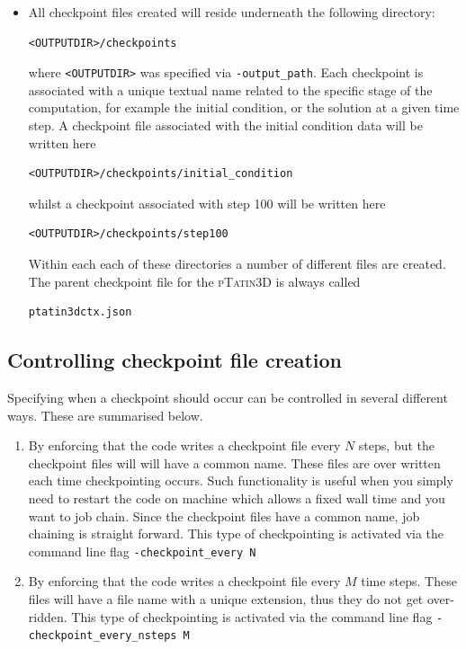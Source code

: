\documentclass[paper=a4, fontsize=11pt,twoside]{scrartcl}
\newcommand{\ptat}{{{\textsc{pTatin3D}}}}
\begin{document}
{{\begin{itemize}
\item All checkpoint files created will reside underneath the following directory:
\begin{lstlisting}
<OUTPUTDIR>/checkpoints
\end{lstlisting}
where {\tt <OUTPUTDIR>} was specified via {\tt -output\_path}.
Each checkpoint is associated with a unique textual name related to the specific stage of the computation, for example
the initial condition, or the solution at a given time step.
A checkpoint file associated with the initial condition data will be written here
\begin{lstlisting}
<OUTPUTDIR>/checkpoints/initial_condition
\end{lstlisting}
whilst a checkpoint associated with step 100 will be written here
\begin{lstlisting}
<OUTPUTDIR>/checkpoints/step100
\end{lstlisting}
Within each each of these directories a number of different files are created.
The parent checkpoint file for the {\ptat} is always called
\begin{lstlisting}
ptatin3dctx.json
\end{lstlisting}
\end{itemize}

\subsection{Controlling checkpoint file creation}
Specifying when a checkpoint should occur can be controlled in several different ways.
These are summarised below.

\begin{enumerate}
\item By enforcing that the code writes a checkpoint file every $N$ steps, but the checkpoint files will will have a common name.
These files are over written each time checkpointing occurs. 
Such functionality is useful when you simply need to restart the code on machine which allows a fixed wall time and you want to job chain.
Since the checkpoint files have a common name, job chaining is straight forward.
This type of checkpointing is activated via the command line flag \newline
{\tt -checkpoint\_every N}

\item By enforcing that the code writes a checkpoint file every $M$ time steps. 
These files will have a file name with a unique extension, thus they do not get over-ridden.
This type of checkpointing is activated via the command line flag \newline
{\tt -checkpoint\_every\_nsteps M}


\end{enumerate}}}
\end{document}
